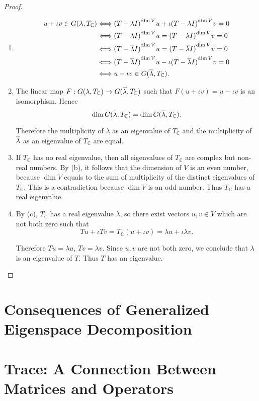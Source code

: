 \begin{proof}
    \begin{enumerate}[label={(\alph*)}]
        \item \begin{align*}
                  u + \iota v\in G(\lambda, T_{\mathbb{C}}) & \Longleftrightarrow {(T - \lambda I)}^{\dim V}u + \iota {(T - \lambda I)}^{\dim V}v = 0               \\
                                                            & \Longleftrightarrow {(T - \lambda I)}^{\dim V}u = {(T - \lambda I)}^{\dim V}v = 0                     \\
                                                            & \Longleftrightarrow {(T - \overline{\lambda} I)}^{\dim V}u = {(T - \overline{\lambda} I)}^{\dim V}v = 0       \\
                                                            & \Longleftrightarrow {(T - \overline{\lambda} I)}^{\dim V}u - \iota {(T - \overline{\lambda} I)}^{\dim V}v = 0 \\
                                                            & \Longleftrightarrow u - \iota v\in G(\overline{\lambda}, T_{\mathbb{C}}).
              \end{align*}
        \item The linear map $F: G(\lambda, T_{\mathbb{C}})\to G(\overline{\lambda}, T_{\mathbb{C}})$ such that $F(u + \iota v) = u - \iota v$ is an isomorphism. Hence
              \[
                  \dim G(\lambda, T_{\mathbb{C}}) = \dim G(\overline{\lambda}, T_{\mathbb{C}}).
              \]

              Therefore the multiplicity of $\lambda$ as an eigenvalue of $T_{\mathbb{C}}$ and the multiplicity of $\overline{\lambda}$ as an eigenvalue of $T_{\mathbb{C}}$ are equal.
        \item If $T_{\mathbb{C}}$ has no real eigenvalue, then all eigenvalues of $T_{\mathbb{C}}$ are complex but non-real numbers. By (b), it follows that the dimension of $V$ is an even number, because $\dim V$ equals to the sum of multiplicity of the distinct eigenvalues of $T_{\mathbb{C}}$. This is a contradiction because $\dim V$ is an odd number. Thus $T_{\mathbb{C}}$ has a real eigenvalue.
        \item By (c), $T_{\mathbb{C}}$ has a real eigenvalue $\lambda$, so there exist vectors $u, v\in V$ which are not both zero such that
              \[
                  Tu + \iota Tv = T_{\mathbb{C}}(u + \iota v) = \lambda u + \iota \lambda v.
              \]

              Therefore $Tu = \lambda u$, $Tv = \lambda v$. Since $u, v$ are not both zero, we conclude that $\lambda$ is an eigenvalue of $T$. Thus $T$ has an eigenvalue.
    \end{enumerate}
\end{proof}
\newpage

\section{Consequences of Generalized Eigenspace Decomposition}

\section{Trace: A Connection Between Matrices and Operators}
